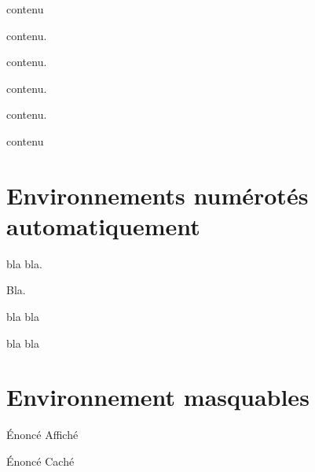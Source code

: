 \documentclass[a4paper,12pt,french]{book}
\begin{document}
\begin{propriete}
	contenu
\end{propriete}

\begin{methode}
	contenu.
\end{methode}

\begin{remarque}
	contenu.
\end{remarque}

\begin{theoreme}
	contenu.
\end{theoreme}

\begin{exemple}
	contenu.
\end{exemple}

\begin{consequence}
	contenu
\end{consequence}


\newpage

\section*{Environnements numérotés automatiquement}

\begin{exercice}
	bla bla.
\end{exercice}

\begin{exercice}
	Bla.
\end{exercice}

\begin{exercicecorrection}
	bla bla
\end{exercicecorrection}

\begin{exercicecorrection}
	bla bla
\end{exercicecorrection}

\newpage

\section*{Environnement masquables}


\afficheEnonce

\begin{enonce}
	Énoncé Affiché
\end{enonce}

\cacheEnonce

\begin{enonce}
	Énoncé Caché
\end{enonce}
\end{document}
